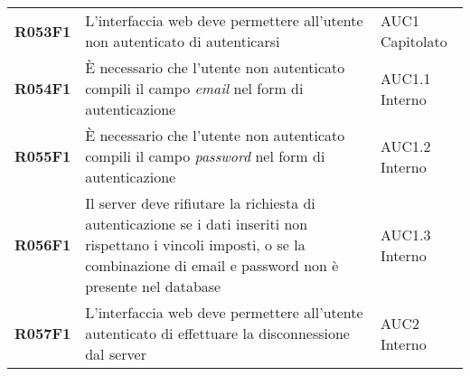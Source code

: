 \documentclass[../analisi-dei-requisiti.tex]{subfiles}
\begin{document}
\begin{longtable}[H]{>{\centering\bfseries}m{3cm} >{\centering}m{10cm} >{\centering\arraybackslash}m{3cm}}
  R053F1                               & L'interfaccia web deve permettere all'utente non autenticato di autenticarsi                                                                                                                            & AUC1 Capitolato               \\
  R054F1                               & È necessario che l'utente non autenticato compili il campo \textit{email} nel form di autenticazione                                                                                                    & AUC1.1 Interno                \\
  R055F1                               & È necessario che l'utente non autenticato compili il campo \textit{password} nel form di autenticazione                                                                                                 & AUC1.2 Interno                \\
  R056F1                               & Il server deve rifiutare la richiesta di autenticazione se i dati inseriti non rispettano i vincoli imposti, o se la combinazione di email e password non è presente nel database                       & AUC1.3 Interno                \\
  R057F1                               & L'interfaccia web deve permettere all'utente autenticato di effettuare la disconnessione dal server                                                                                                     & AUC2 Interno                  \\


\end{longtable}
\end{document}

